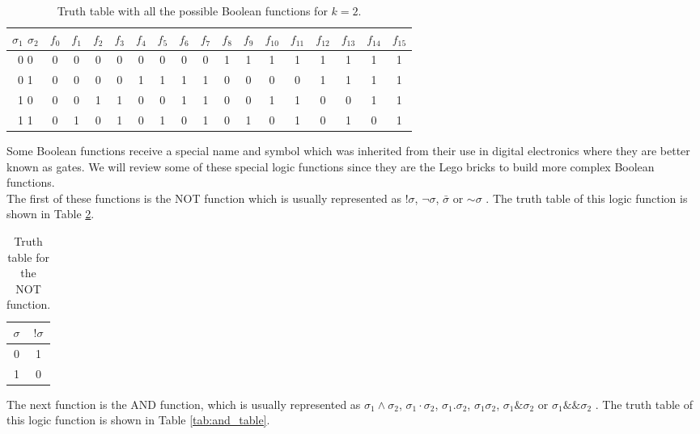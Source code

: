 \begin{table}[t]
\centering
\begin{tabular}{ |c||c|c|c|c|c|c|c|c|c|c|c|c|c|c|c|c| } 
 \hline
 $\sigma_{1}$	$\sigma_{2}$ & $f_{0}$ & $f_{1}$ & $f_{2}$ & $f_{3}$ & $f_{4}$ & $f_{5}$ &$f_{6}$ &$f_{7}$ &$f_{8}$ &$f_{9}$ &$f_{10}$ &$f_{11}$ &$f_{12}$ &$f_{13}$ &$f_{14}$ &$f_{15}$ \\ 
 \hline
 \hline
 0	0 & 0& 0& 0& 0& 0& 0& 0& 0& 1& 1& 1& 1& 1& 1& 1& 1\\ 
 \hline
 0	1 & 0& 0& 0& 0& 1& 1& 1& 1& 0& 0& 0& 0& 1& 1& 1& 1\\
 \hline
 1	0 & 0& 0& 1& 1& 0& 0& 1& 1& 0& 0& 1& 1& 0& 0& 1& 1\\
 \hline
 1	1 & 0& 1& 0& 1& 0& 1& 0& 1& 0& 1& 0& 1& 0& 1& 0& 1\\
 \hline
\end{tabular}
 \caption{Truth table with all the possible Boolean functions for $k=2$.}
 \label{tab:truth_table}
\end{table}

Some Boolean functions receive a special name and symbol which was inherited from their use in digital electronics where they are better known as gates. We will review some of these special logic functions since they are the Lego bricks to build more complex Boolean functions.\\ 

The first of these functions is the NOT function which is usually represented as $! \sigma$, $ \neg \sigma$, $\bar{\sigma}$ or $\sim \sigma$ \cite{gates}. The truth table of this logic function is shown in Table \ref{tab:not_table}.

\begin{table}[h]
\centering
\begin{tabular}{ |c||c| } 
 \hline
 $\sigma$ & $! \sigma$\\ 
 \hline
 \hline
 0	& 1\\ 
 \hline
 1	& 0\\
 \hline
\end{tabular}
 \caption{Truth table for the NOT function.}
 \label{tab:not_table}
\end{table}

The next function is the AND function, which is usually represented as $\sigma_{1} \wedge \sigma_{2}$, $\sigma_{1} \cdot \sigma_{2}$, $\sigma_{1} . \sigma_{2}$, $\sigma_{1} \sigma_{2}$, $\sigma_{1} \& \sigma_{2}$ or $\sigma_{1} \& \& \sigma_{2}$ \cite{gates}. The truth table of this logic function is shown in Table \ref{tab:and_table}.

